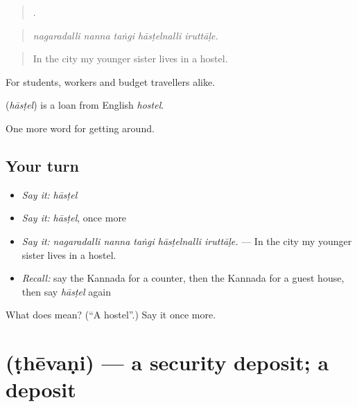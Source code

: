 \begin{quote}
    .
\end{quote}

\begin{quote}
\emph{nagaradalli nanna taṅgi hāsṭelnalli iruttāḷe.}
\end{quote}

\begin{quote}
In the city my younger sister lives in a hostel.
\end{quote}

For students, workers and budget travellers alike.

\begin{cousinweb}
\textbf{} (\emph{hāsṭel}) is a loan from English \emph{hostel}.
\end{cousinweb}

\begin{grammarlens}[title={What you've built}]
One more word for getting around.
\end{grammarlens}

\subsection*{Your turn}
\begin{itemize}
\raggedright
  \item \emph{Say it:} \emph{hāsṭel}
  \item \emph{Say it:} \emph{hāsṭel}, once more
  \item \emph{Say it:} \emph{nagaradalli nanna taṅgi hāsṭelnalli iruttāḷe.} — In the city my younger sister lives in a hostel.
  \item \emph{Recall:} say the Kannada for a counter, then the Kannada for a guest house, then say \emph{hāsṭel} again
\end{itemize}

\begin{tcolorbox}[breakable,colback=teal!4,colframe=teal!35!black,title={Before you move on}]
What does  mean? (\textquotedblleft{}A hostel\textquotedblright{}.) Say it once more.
\end{tcolorbox}
\section[\texorpdfstring{\kn{ಠೇವಣಿ} (ṭhēvaṇi)}{ಠೇವಣಿ (ṭhēvaṇi)}]{ (ṭhēvaṇi) — a security deposit; a deposit}

